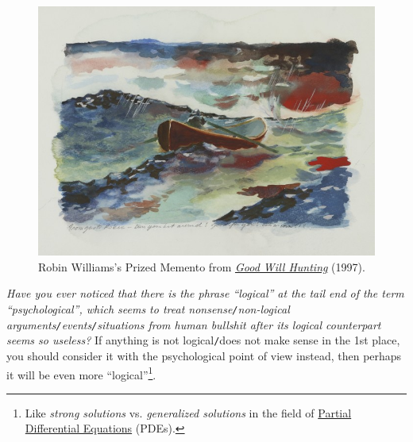 \documentclass[12pt]{article}
\begin{document}
\begin{figure}[H]
	\centering
	\includegraphics[width = 15cm]{boat_under_storm}
	\caption{{\sc Robin Williams}'s Prized Memento from \href{https://www.imdb.com/title/tt0119217}{\it Good Will Hunting} (1997).}
	\label{fig6}
\end{figure}
{\it Have you ever noticed that there is the phrase ``logical'' at the tail end of the term ``psychological'', which seems to treat nonsense{\tt/}non-logical arguments{\tt/}events{\tt/}situations from human bullshit after its logical counterpart seems so useless?} If anything is not logical{\tt/}does not make sense in the 1st place, you should consider it with the psychological point of view instead, then perhaps it will be even more ``logical''\footnote{Like {\it strong solutions} vs. {\it generalized solutions} in the field of \href{https://en.wikipedia.org/wiki/Partial_differential_equation}{Partial Differential Equations} (PDEs).}.
\end{document}
